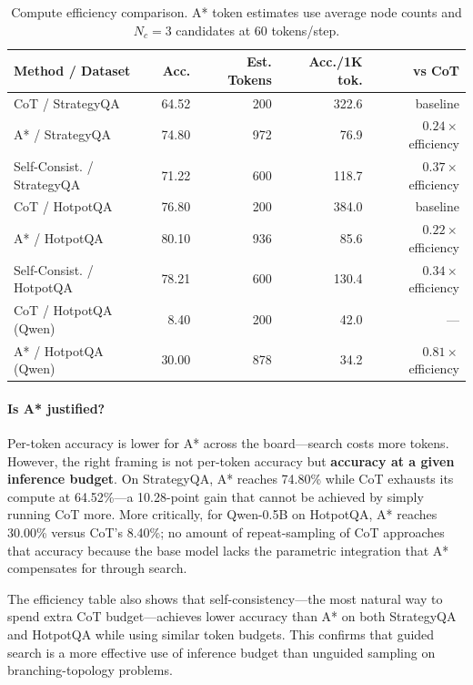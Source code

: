 \documentclass[11pt]{article}
\begin{document}
\begin{table}[t]
\centering
\caption{Compute efficiency comparison. A* token estimates use average node counts and $N_c=3$ candidates at 60 tokens/step.}
\label{tab:efficiency}
\small
\begin{tabular}{lrrrr}
\toprule
\textbf{Method / Dataset} & \textbf{Acc.} & \textbf{Est. Tokens} & \textbf{Acc./1K tok.} & \textbf{vs CoT} \\
\midrule
CoT / StrategyQA         & 64.52 & 200    & 322.6 & baseline \\
A* / StrategyQA          & 74.80 & 972    & 76.9  & $0.24\times$ efficiency \\
Self-Consist. / StrategyQA & 71.22 & 600    & 118.7  & $0.37\times$ efficiency \\
\midrule
CoT / HotpotQA           & 76.80 & 200    & 384.0 & baseline \\
A* / HotpotQA            & 80.10 & 936    & 85.6  & $0.22\times$ efficiency \\
Self-Consist. / HotpotQA & 78.21 & 600    & 130.4  & $0.34\times$ efficiency \\
\midrule
CoT / HotpotQA (Qwen)    &  8.40 & 200    &  42.0 & --- \\
A* / HotpotQA (Qwen)     & 30.00 & 878    &  34.2 & $0.81\times$ efficiency \\
\bottomrule
\end{tabular}
\end{table}

\paragraph{Is A* justified?}
Per-token accuracy is lower for A* across the board—search costs more tokens. However, the right framing is not per-token accuracy but \textbf{accuracy at a given inference budget}. On StrategyQA, A* reaches 74.80\% while CoT exhausts its compute at 64.52\%—a 10.28-point gain that cannot be achieved by simply running CoT more. More critically, for Qwen-0.5B on HotpotQA, A* reaches 30.00\% versus CoT's 8.40\%; no amount of repeat-sampling of CoT approaches that accuracy because the base model lacks the parametric integration that A* compensates for through search.

The efficiency table also shows that self-consistency—the most natural way to spend extra CoT budget—achieves lower accuracy than A* on both StrategyQA and HotpotQA while using similar token budgets. This confirms that guided search is a more effective use of inference budget than unguided sampling on branching-topology problems.
\end{document}
